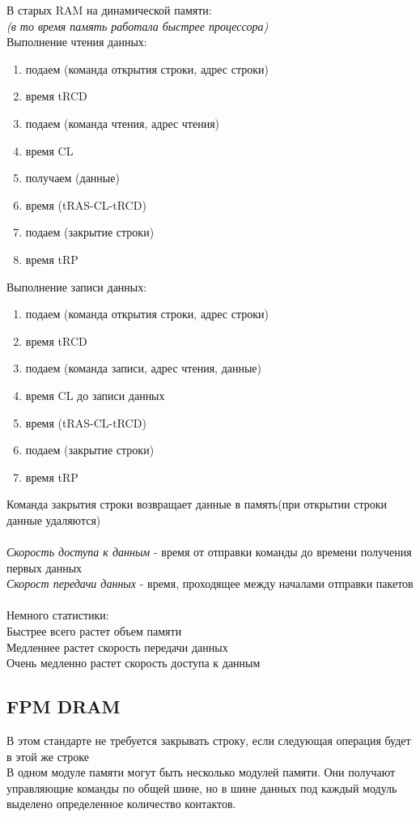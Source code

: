 \documentclass[12pt]{article}
\begin{document}
В старых RAM на динамической памяти:\\
\textit{(в то время память работала быстрее процессора)}\\
Выполнение чтения данных:\\
\begin{enumerate}
    \item подаем (команда открытия строки, адрес строки)
    \item время tRCD 
    \item подаем (команда чтения, адрес чтения) 
    \item время CL
    \item получаем (данные)
    \item время (tRAS-CL-tRCD) 
    \item подаем (закрытие строки) 
    \item время tRP
\end{enumerate}
Выполнение записи данных:\\
\begin{enumerate}
    \item подаем (команда открытия строки, адрес строки)
    \item время tRCD 
    \item подаем (команда записи, адрес чтения, данные)
    \item время CL до записи данных
    \item время (tRAS-CL-tRCD)
    \item подаем (закрытие строки)
    \item время tRP
\end{enumerate}
Команда закрытия строки возвращает данные в память(при открытии строки данные удаляются)\\\\

\textit{Скорость доступа к данным} - время от отправки команды до времени получения первых данных\\
\textit{Скорост передачи данных} - время, проходящее между началами отправки пакетов\\\\
Немного статистики:\\
Быстрее всего растет объем памяти\\
Медленнее растет скорость передачи данных\\
Очень медленно растет скорость доступа к данным
\subsection{FPM DRAM}
В этом стандарте не требуется закрывать строку, если следующая операция будет в этой же строке\\
В одном модуле памяти могут быть несколько модулей памяти. Они получают управляющие команды по общей шине, но в шине данных под каждый модуль выделено определенное количество контактов.
\end{document}
